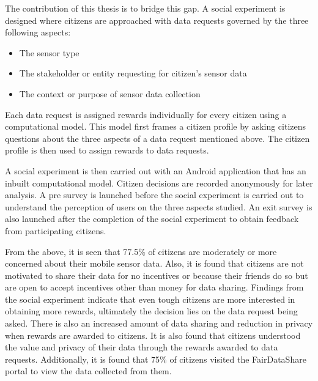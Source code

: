 The contribution of this thesis is to bridge this gap. A social experiment is designed where citizens are approached with data requests governed by the three following aspects:

\begin{itemize}
\item The sensor type
\item The stakeholder or entity requesting for citizen's sensor data
\item The context or purpose of sensor data collection
\end{itemize} 

Each data request is assigned rewards individually for every citizen using a computational model. This model first frames a citizen profile by asking citizens questions about the three aspects of a data request mentioned above. The citizen profile is then used to assign rewards to data requests.

A social experiment is then carried out with an Android application that has an inbuilt computational model. Citizen decisions are recorded anonymously for later analysis. A pre survey is launched before the social experiment is carried out to understand the perception of users on the three aspects studied. An exit survey is also launched after the completion of the social experiment to obtain feedback from participating citizens. 

From the above, it is seen that 77.5\% of citizens are moderately or more concerned about their mobile sensor data. Also, it is found that citizens are not motivated to share their data for no incentives or because their friends do so but are open to accept incentives other than money for data sharing. Findings from the social experiment indicate that even tough citizens are more interested in obtaining more rewards, ultimately the decision lies on the data request being asked. There is also an increased amount of data sharing and reduction in privacy when rewards are awarded to citizens. It is also found that citizens understood the value and privacy of their data through the rewards awarded to data requests. Additionally, it is found that 75\% of citizens visited the FairDataShare portal to view the data collected from them.  

